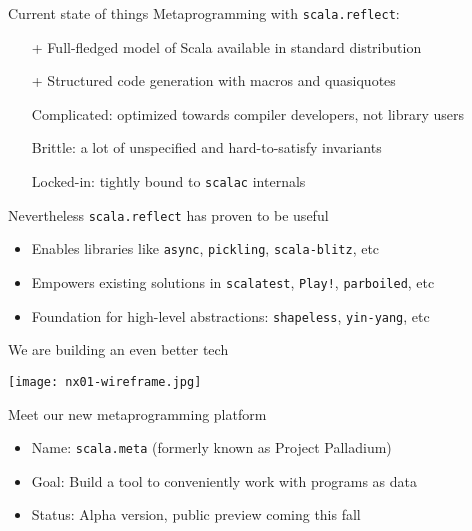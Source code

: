 \documentclass[svgnames,dvipsnames,hyperref={bookmarks=false},usepdftitle=false]{beamer}
\begin{document}
\begin{frame}{Current state of things}
Metaprogramming with \texttt{scala.reflect}:
\begin{itemize}
\item[+] Full-fledged model of Scala available in standard distribution
\item[+] Structured code generation with macros and quasiquotes
\end{itemize}
\pause
\begin{itemize}
\item[\textendash] Complicated: optimized towards compiler developers, not library users
\item[\textendash] Brittle: a lot of unspecified and hard-to-satisfy invariants
\item[\textendash] Locked-in: tightly bound to \texttt{scalac} internals
\end{itemize}
\end{frame}

\begin{frame}{Nevertheless \texttt{scala.reflect} has proven to be useful}
\begin{itemize}
\item Enables libraries like \texttt{async}, \texttt{pickling}, \texttt{scala-blitz}, etc
\item Empowers existing solutions in \texttt{scalatest}, \texttt{Play!}, \texttt{parboiled}, etc
\item Foundation for high-level abstractions: \texttt{shapeless}, \texttt{yin-yang}, etc
\end{itemize}
\end{frame}

\begin{frame}[c, fragile]{We are building an even better tech}
\begin{center}
\texttt{[image: nx01-wireframe.jpg]}
\end{center}
\end{frame}


\begin{frame}{Meet our new metaprogramming platform}
\begin{itemize}
\item Name: \texttt{scala.meta} (formerly known as Project Palladium)
\item Goal: Build a tool to conveniently work with programs as data
\item Status: Alpha version, public preview coming this fall
\end{itemize}
\end{frame}
\end{document}
